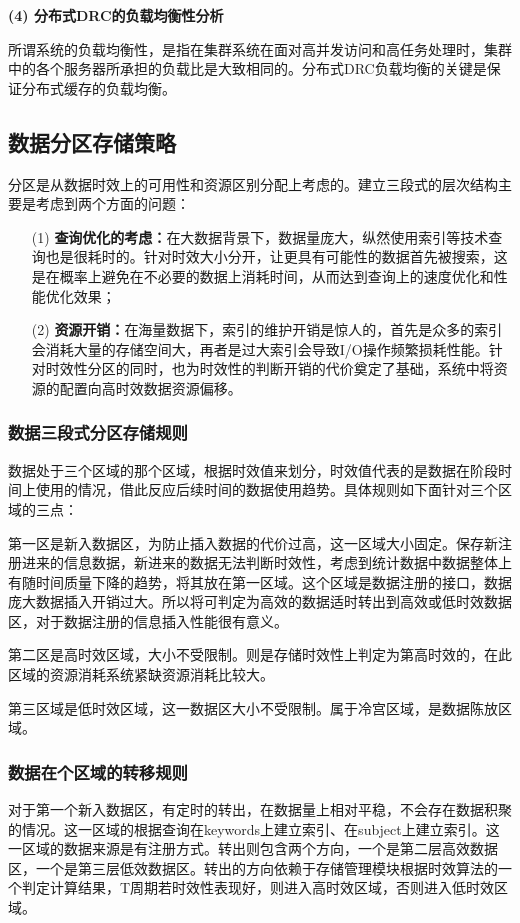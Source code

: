 \documentclass[article]{BJTU-thesis}
\begin{document}
	\noindent\textbf{(4) 分布式DRC的负载均衡性分析}

	所谓系统的负载均衡性，是指在集群系统在面对高并发访问和高任务处理时，集群中的各个服务器所承担的负载比是大致相同的。分布式DRC负载均衡的关键是保证分布式缓存的负载均衡。 
	
	\subsection{数据分区存储策略}

	分区是从数据时效上的可用性和资源区别分配上考虑的\cite{ld}。建立三段式的层次结构主要是考虑到两个方面的问题：
	\begin{enumerate}
		\item[(1)] \textbf{查询优化的考虑：}在大数据背景下，数据量庞大，纵然使用索引等技术查询也是很耗时的。针对时效大小分开，让更具有可能性的数据首先被搜索，这是在概率上避免在不必要的数据上消耗时间，从而达到查询上的速度优化和性能优化效果；
		\item[(2)] \textbf{资源开销：}在海量数据下，索引的维护开销是惊人的，首先是众多的索引会消耗大量的存储空间大，再者是过大索引会导致I/O操作频繁损耗性能。针对时效性分区的同时，也为时效性的判断开销的代价奠定了基础，系统中将资源的配置向高时效数据资源偏移。
	\end{enumerate}

	\subsubsection{数据三段式分区存储规则}
	数据处于三个区域的那个区域，根据时效值来划分，时效值代表的是数据在阶段时间上使用的情况，借此反应后续时间的数据使用趋势。具体规则如下面针对三个区域的三点：
	
	第一区是新入数据区，为防止插入数据的代价过高，这一区域大小固定。保存新注册进来的信息数据，新进来的数据无法判断时效性，考虑到统计数据中数据整体上有随时间质量下降的趋势，将其放在第一区域。这个区域是数据注册的接口，数据庞大数据插入开销过大。所以将可判定为高效的数据适时转出到高效或低时效数据区，对于数据注册的信息插入性能很有意义。
	
	第二区是高时效区域，大小不受限制。则是存储时效性上判定为第高时效的，在此区域的资源消耗系统紧缺资源消耗比较大。
	
	第三区域是低时效区域，这一数据区大小不受限制。属于冷宫区域，是数据陈放区域。
	\subsubsection{数据在个区域的转移规则}
	对于第一个新入数据区，有定时的转出，在数据量上相对平稳，不会存在数据积聚的情况。这一区域的根据查询在keywords上建立索引、在subject上建立索引。这一区域的数据来源是有注册方式。转出则包含两个方向，一个是第二层高效数据区，一个是第三层低效数据区。转出的方向依赖于存储管理模块根据时效算法的一个判定计算结果，T周期若时效性表现好，则进入高时效区域，否则进入低时效区域。
	
\end{document}
